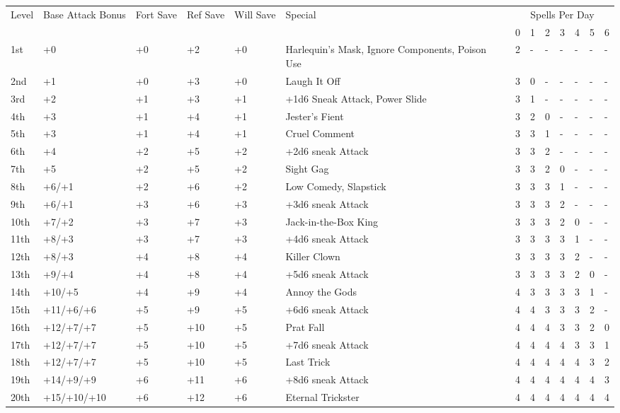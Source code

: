 \documentclass[10pt]{article}
\begin{document}
\begin{table}[tbh]
\begin{small}
\begin{tabular}{lp{2cm}p{0.7cm}p{0.7cm}p{0.7cm}p{5cm}lllllll}
Level  &Base Attack Bonus &Fort Save &Ref Save &Will Save &Special &\multicolumn{7}{c}{Spells Per Day}\\
&&&&&&0 &1 &2 &3 &4 &5 &6\\
1st &+0 &+0 &+2 &+0 &Harlequin's Mask, Ignore Components, Poison Use &2 &- &- &- &- &- &-\\
2nd &+1 &+0 &+3 &+0 &Laugh It Off &3 &0 &- &- &- &- &-\\
3rd &+2 &+1 &+3 &+1 &+1d6 Sneak Attack, Power Slide &3 &1 &- &- &- &- &-\\
4th &+3 &+1 &+4 &+1 &Jester's Fient &3 &2 &0 &- &- &- &-\\
5th &+3 &+1 &+4 &+1 &Cruel Comment &3 &3 &1 &- &- &- &-\\
6th &+4 &+2 &+5 &+2 &+2d6 sneak Attack &3 &3 &2 &- &- &- &-\\
7th &+5 &+2 &+5 &+2 &Sight Gag &3 &3 &2 &0 &- &- &-\\
8th &+6/+1 &+2 &+6 &+2 &Low Comedy, Slapstick &3 &3 &3 &1 &- &- &-\\
9th &+6/+1 &+3 &+6 &+3 &+3d6 sneak Attack &3 &3 &3 &2 &- &- &-\\
10th &+7/+2 &+3 &+7 &+3 &Jack-in-the-Box King &3 &3 &3 &2 &0 &- &-\\
11th &+8/+3 &+3 &+7 &+3 &+4d6 sneak Attack &3 &3 &3 &3 &1 &- &-\\
12th &+8/+3 &+4 &+8 &+4 &Killer Clown &3 &3 &3 &3 &2 &- &-\\
13th &+9/+4 &+4 &+8 &+4 &+5d6 sneak Attack &3 &3 &3 &3 &2 &0 &-\\
14th &+10/+5 &+4 &+9 &+4 &Annoy the Gods &4 &3 &3 &3 &3 &1 &-\\
15th &+11/+6/+6 &+5 &+9 &+5 &+6d6 sneak Attack &4 &4 &3 &3 &3 &2 &-\\
16th &+12/+7/+7 &+5 &+10 &+5 &Prat Fall &4 &4 &4 &3 &3 &2 &0\\
17th &+12/+7/+7 &+5 &+10 &+5 &+7d6 sneak Attack &4 &4 &4 &4 &3 &3 &1\\
18th &+12/+7/+7 &+5 &+10 &+5 &Last Trick &4 &4 &4 &4 &4 &3 &2\\
19th &+14/+9/+9 &+6 &+11 &+6 &+8d6 sneak Attack &4 &4 &4 &4 &4 &4 &3\\
20th &+15/+10/+10 &+6 &+12 &+6 &Eternal Trickster &4 &4 &4 &4 &4 &4 &4\\

\end{tabular}
\end{small}
\end{table}
\end{document}
